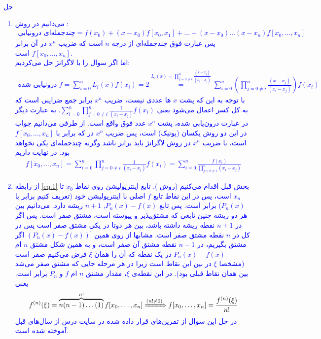 \textcolor{blue}{حل
\begin{enumerate}
    \item 
    می‌دانیم در روش
    :
    \begin{align} \label{eq:1}
        \text{چندجمله‌ای درونیابی} = f(x_0) + (x - x_0) f[x_0, x_1] + \dots + (x - x_0) \dots (x - x_n) f[x_0, \dots, x_n]
    \end{align}
    پس عبارت فوق چندجمله‌ای از درجه
    $n$
    است که ضریب 
    $x^n$
    در آن برابر 
    $f[x_0, \dots, x_n]$
    است. 
    \\
    اما اگر سوال را با لاگرانژ حل می‌کردیم:
    \begin{align*}
    \text{درونیابی شده
    $f$} = \sum_{i = 0}^{n} L_i (x) f(x_i) = 2 \stackrel{L_i(x) = \prod_{j = 0 \neq i}^{n} \frac{(x - x_j)}{(x_i - x_j)}}{=} \sum_{i = 0}^{n} (\prod_{j = 0 \neq i}^{n} \frac{(x- x_j)}{(x_i - x_j)}) f(x_i)
    \end{align*}
    با توجه به این که پشت
    $x$
    ها عددی نیست، ضریب 
    $x^n$
    برابر جمع ضرایبی است که به کل کسر اعمال می‌شود یعنی
    $\sum_{i = 0}^{n} \prod_{j = 0 \neq i}^{n} \frac{1}{(x_i - x_j)} f(x_i)$.
    به عبارت دیگر در عبارت درون‌یابی شده، پشت 
    $x^n$
    عدد فوق واقع است. از طرفی می‌دانیم
    جواب
    در این دو روش یکسان (یونیک) است، پس ضریب 
    $x^n$
    در
    که برابر با
    $f[x_0, \dots, x_n]$
    است، با ضریب 
    $x^n$
    در روش لاگرانژ باید برابر باشد وگرنه چندجمله‌ای یکی نخواهد بود. در نهایت داریم
    \begin{align*}
        f[x_0, \dots, x_n] = \sum_{i = 0}^{n} \prod_{j = 0 \neq i}^{n} \frac{1}{(x_i - x_j)} f(x_i) = \sum_{i = 0}^{n} \frac{f(x_i)}{\prod_{j = 0 \neq i}^{n} (x_i - x_j)}
    \end{align*}
    \item 
    از رابطه
    \ref{eq:1}
    بخش قبل اقدام می‌کنیم
    (روش 
    ).
    تابع 
    اینترپولیشن روی نقاط
    $x_0$
    تا
    $x_n$
    است، پس در این نقاط تابع
    $f$
    اصلی با اینترپولیشن خود (تعریف کنیم برابر با
    $P_n(x)$)
    برابر است. پس تابع
    $P_n(x) - f(x)$,
    $n + 1$
    ریشه دارد. می‌دانیم بین هر دو ریشه چنین تابعی که مشتق‌پذیر و پیوسته است، مشتق صفر است.
    پس اگر در 
    $n + 1$
    نقطه ریشه داشته باشد، بین هر دوتا در یکی مشتق صفر است پس در کل در 
    $n$
    نقطه مشتق صفر است. مشابها از روی همین 
    $(P_n(x) - f(x))^{'}$
    اگر مشتق بگیریم، در 
    $n - 1$
    نقطه مشتق آن صفر است، و به همین شکل مشتق 
    $n$
    ام 
    $P_n(x) - f(x)$
    در یک نقطه که آن را همان
    $\xi$
    فرض می‌کنیم صفر است (مشخصا 
    $\xi$
    در بین این نقاط است زیرا در هر مرحله جایی که مشتق صفر می‌شد بین همان نقاط قبلی بود). در این نقطه‌ی 
    $\xi$،
    مقدار مشتق 
    $n$
    ام 
    $f$
    و
    $P_n$
    برابر است. یعنی
    \begin{align*}
        f^{(n)}(\xi) =\overbrace{n(n-1) \dots (1)}^{n!} f[x_0, \dots,x_n] \xRightarrow{(n! \neq 0)} f[x_0, \dots ,x_n] = \frac{f^{(n)}(\xi)}{n!}
    \end{align*}
    در حل این سوال از تمرین‌های قرار داده شده در سایت درس از سال‌های قبل آموخته شده است.
\end{enumerate}
}

